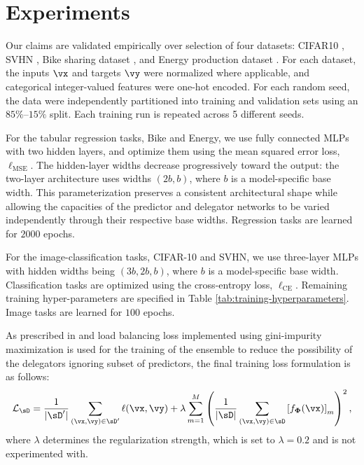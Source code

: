 \documentclass[10pt]{article} %
\def\vPhi{{\bm{\Phi}}}
\begin{document}
\section{Experiments}

Our claims are validated empirically over selection of four datasets: CIFAR10 \citep{krizhevsky2009learning}, SVHN \citep{netzer2011reading}, Bike sharing dataset \citep{bike_sharing_275}, and Energy production dataset \citep{energydataset}. For each dataset, the inputs $\vx$ and targets $\vy$ were normalized where applicable, and categorical integer-valued features were one-hot encoded. For each random seed, the data were independently partitioned into training and validation sets using an $85\%$--$15\%$ split. Each training run is repeated across 5 different seeds.

For the tabular regression tasks, Bike and Energy, we use fully connected MLPs with two hidden layers, and optimize them using the mean squared error loss, $\ell_{\mathrm{MSE}}$. The hidden-layer widths decrease progressively toward the output: the two-layer architecture uses widths $(2b, b)$, where $b$ is a model-specific base width. This parameterization preserves a consistent architectural shape while allowing the capacities of the predictor and delegator networks to be varied independently through their respective base widths. Regression tasks are learned for $2000$ epochs.

For the image-classification tasks, CIFAR-10 and SVHN, we use three-layer MLPs with hidden widths being $(3b, 2b, b)$, where $b$ is a model-specific base width. Classification tasks are optimized using the cross-entropy loss, $\ell_{\mathrm{CE}}$. Remaining training hyper-parameters are specified in Table \ref{tab:training-hyperparameters}. Image tasks are learned for $100$ epochs.

As prescribed in \citet{shazeer2017outrageously} and \citet{fedus2022switch} load balancing loss implemented using gini-impurity maximization is used for the training of the ensemble to reduce the possibility of the delegators ignoring subset of predictors, the final training loss formulation is as follows:
\begin{equation}
    \mathcal{L}_{\sD}
    =
    \frac{1}{\lvert\sD'\rvert}
    \sum_{(\vx,\vy)\in\sD'}
    \ell(\vx,\vy)
    +
    \lambda
    \sum_{m=1}^{M}
    \left(
        \frac{1}{\lvert\sD\rvert}
        \sum_{(\vx,\vy)\in\sD}
        \left[f_{\vPhi}(\vx)\right]_m
    \right)^2 ,
\end{equation}
where $\lambda$ determines the regularization strength, which is set to $\lambda=0.2$ and is not experimented with.    
\end{document}
